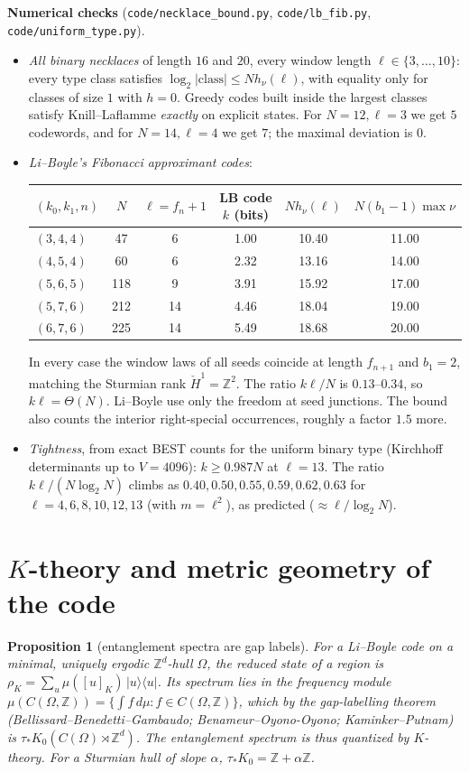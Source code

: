 \documentclass[11pt]{article}
\newtheorem{proposition}[theorem]{Proposition}
\theoremstyle{definition}
\theoremstyle{remark}
\newcommand{\Z}{\mathbb Z}
\begin{document}
\textbf{Numerical checks} (\texttt{code/necklace\_bound.py}, \texttt{code/lb\_fib.py}, \texttt{code/uniform\_type.py}).
\begin{itemize}
\item \emph{All binary necklaces} of length $16$ and $20$, every window length $\ell\in\{3,\dots,10\}$: every type class satisfies $\log_2|\text{class}|\le Nh_\nu(\ell)$, with equality only for classes of size $1$ with $h=0$. Greedy codes built inside the largest classes satisfy Knill--Laflamme \emph{exactly} on explicit states. For $N=12,\ell=3$ we get $5$ codewords, and for $N=14,\ell=4$ we get $7$; the maximal deviation is $0$.
\item \emph{Li--Boyle's Fibonacci approximant codes}:
\begin{center}\small
\begin{tabular}{lccccc}
\toprule
$(k_0,k_1,n)$ & $N$ & $\ell=f_n+1$ & LB code $k$ (bits) & $Nh_\nu(\ell)$ & $N(b_1-1)\max\nu$\\
\midrule
$(3,4,4)$ & 47 & 6 & 1.00 & 10.40 & 11.00\\
$(4,5,4)$ & 60 & 6 & 2.32 & 13.16 & 14.00\\
$(5,6,5)$ & 118 & 9 & 3.91 & 15.92 & 17.00\\
$(5,7,6)$ & 212 & 14 & 4.46 & 18.04 & 19.00\\
$(6,7,6)$ & 225 & 14 & 5.49 & 18.68 & 20.00\\
\bottomrule
\end{tabular}
\end{center}
In every case the window laws of all seeds coincide at length $f_{n+1}$ and $b_1=2$, matching the Sturmian rank $\check H^1=\Z^2$. The ratio $k\ell/N$ is $0.13$--$0.34$, so $k\ell=\Theta(N)$. Li--Boyle use only the freedom at seed junctions. The bound also counts the interior right-special occurrences, roughly a factor $1.5$ more.
\item \emph{Tightness}, from exact BEST counts for the uniform binary type (Kirchhoff determinants up to $V=4096$): $k\ge0.987N$ at $\ell=13$. The ratio $k\ell/(N\log_2N)$ climbs as $0.40,0.50,0.55,0.59,0.62,0.63$ for $\ell=4,6,8,10,12,13$ (with $m=\ell^2$), as predicted ($\approx\ell/\log_2N$).
\end{itemize}

\section{$K$-theory and metric geometry of the code}

\begin{proposition}[entanglement spectra are gap labels]\label{prop:gl}
For a Li--Boyle code on a minimal, uniquely ergodic $\Z^d$-hull $\Omega$, the reduced state of a region is $\rho_K=\sum_u\mu([u]_K)\,|u\rangle\langle u|$. Its spectrum lies in the frequency module $\mu(C(\Omega,\Z))=\{\int f\,d\mu:f\in C(\Omega,\Z)\}$, which by the gap-labelling theorem (Bellissard--Benedetti--Gambaudo; Benameur--Oyono-Oyono; Kaminker--Putnam) is $\tau_*K_0(C(\Omega)\rtimes\Z^d)$. The entanglement spectrum is thus quantized by $K$-theory. For a Sturmian hull of slope $\alpha$, $\tau_*K_0=\Z+\alpha\Z$.
\end{proposition}
\end{document}
